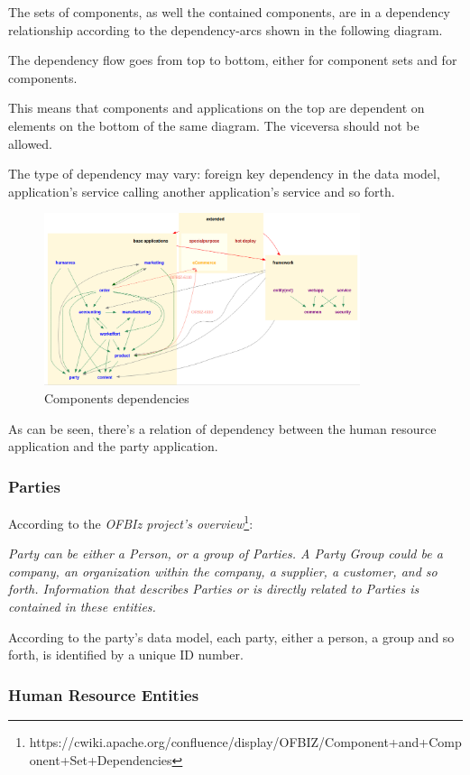 The sets of components, as well the contained components, are in a dependency relationship according to the dependency-arcs shown in the following diagram.

The dependency flow goes from top to bottom, either for component sets and for components.

This means that components and applications on the top are dependent on elements on the bottom of the same diagram. The viceversa should not be allowed.

The type of dependency may vary: foreign key dependency in the data model, application's service calling another application's service and so forth.

\begin{figure}[H]
	\centerline{
		\includegraphics[width=350px]{../Datas/images/dependencies.png}
	}
	\label{fig:components-dependencies}
	\caption{Components dependencies}
\end{figure}

As can be seen, there's a relation of dependency between the human resource application and the party application.
\newpage

\subsubsection{Parties}
According to the {\textit{OFBIz project's overview}}\footnote{https://cwiki.apache.org/confluence/display/OFBIZ/Component+and+Component+Set+Dependencies}:

\textit{Party can be either a Person, or a group of Parties. A Party Group could be a company, an organization within the company, a supplier, a customer, and so forth.
Information that describes Parties or is directly related to Parties is contained in these entities.}

According to the party's data model, each party, either a person, a group and so forth, is identified by a unique ID number.

\subsubsection{Human Resource Entities}

